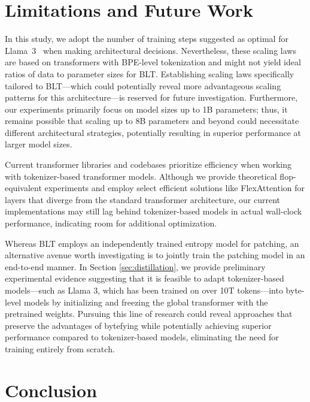 \section{Limitations and Future Work}

In this study, we adopt the number of training steps suggested as optimal for Llama~3~\citep{dubey2024llama} when making architectural decisions. Nevertheless, these scaling laws are based on transformers with BPE-level tokenization and might not yield ideal ratios of data to parameter sizes for {\textsc BLT}. Establishing scaling laws specifically tailored to {\textsc BLT}—which could potentially reveal more advantageous scaling patterns for this architecture—is reserved for future investigation. Furthermore, our experiments primarily focus on model sizes up to 1B parameters; thus, it remains possible that scaling up to 8B parameters and beyond could necessitate different architectural strategies, potentially resulting in superior performance at larger model sizes.

Current transformer libraries and codebases prioritize efficiency when working with tokenizer-based transformer models. Although we provide theoretical flop-equivalent experiments and employ select efficient solutions like FlexAttention for layers that diverge from the standard transformer architecture, our current implementations may still lag behind tokenizer-based models in actual wall-clock performance, indicating room for additional optimization.

Whereas {\textsc BLT} employs an independently trained entropy model for patching, an alternative avenue worth investigating is to jointly train the patching model in an end-to-end manner. In Section \ref{sec:distillation}, we provide preliminary experimental evidence suggesting that it is feasible to adapt tokenizer-based models—such as Llama 3, which has been trained on over 10T tokens—into byte-level models by initializing and freezing the global transformer with the pretrained weights. Pursuing this line of research could reveal approaches that preserve the advantages of bytefying while potentially achieving superior performance compared to tokenizer-based models, eliminating the need for training entirely from scratch.

\section{Conclusion}
\label{section:conclusion}

